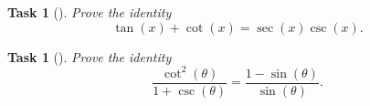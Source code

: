\documentclass[10pt,]{article}
\theoremstyle{plain}
\newtheorem{proposition}[theorem]{Task}
\theoremstyle{definition}
\numberwithin{equation}{section}
\begin{document}
\begin{proposition}[{}]\label{proposition-77}
\hypertarget{p-140}{}%
Prove the identity%
\begin{equation*}
\tan(x)+\cot(x)=\sec(x)\csc(x)\text{.}
\end{equation*}
%
\end{proposition}
\begin{proposition}[{}]\label{proposition-78}
\hypertarget{p-141}{}%
Prove the identity%
\begin{equation*}
\frac{\cot^2(\theta)}{1+\csc(\theta)} = \frac{1 - \sin(\theta)}{\sin(\theta)}\text{.}
\end{equation*}
%
\end{proposition}
\end{document}
